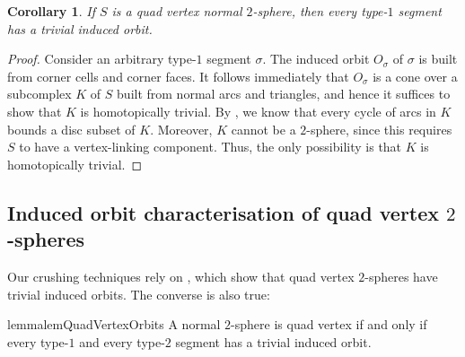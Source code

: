 \documentclass[10pt,a4paper]{amsart}
\newtheorem{corollary}[theorem]{Corollary}
\begin{document}
\begin{corollary}\label{cor:cornerRegion}
If $S$ is a quad vertex normal $2$-sphere, then every type-$1$ segment has a trivial induced orbit.
\end{corollary}

\begin{proof}
Consider an arbitrary type-$1$ segment $\sigma$.
The induced orbit $O_\sigma$ of $\sigma$ is built from corner cells and corner faces.
It follows immediately that $O_\sigma$ is a cone over a subcomplex $K$ of $S$ built from
normal arcs and triangles, and hence it suffices to show that $K$ is homotopically trivial.
By , we know that every cycle of arcs in $K$ bounds a disc subset of $K$.
Moreover, $K$ cannot be a $2$-sphere, since this requires $S$ to have a vertex-linking component.
Thus, the only possibility is that $K$ is homotopically trivial.
\end{proof}

\subsection{Induced orbit characterisation of quad vertex \texorpdfstring{$2$}{2}-spheres}\label{ssec:characteriseQuadVertexSphere}

Our crushing techniques rely on , which show that quad vertex $2$-spheres have trivial induced orbits.
The converse is also true:

\begin{restatable}{lemma}{lemQuadVertexOrbits}\label{lem:quadVertexOrbits}
A normal $2$-sphere is quad vertex if and only if every type-$1$ and every type-$2$ segment has a trivial induced orbit.
\end{restatable}
\end{document}
